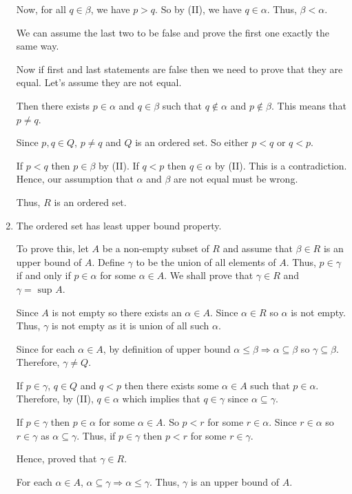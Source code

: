 \begin{enumerate}[{\bf Step 1.}]
Now, for all $q \in \beta$, we have $p > q$.
So by (II), we have $q \in \alpha$. Thus, $\beta < \alpha$.

We can assume the last two to be false and prove the first one exactly the same way.

Now if first and last statements are false then we need to prove that they are equal.
Let's assume they are not equal.

Then there exists $p \in \alpha$ and $q \in \beta$ such that $q \notin \alpha$ and $p \notin \beta$.
This means that $p \neq q$.

Since $p, q \in Q$, $p \neq q$ and $Q$ is an ordered set.
So either $p < q$ or $q < p$.

If $p < q$ then $p \in \beta$ by (II). If $q < p$ then $q \in \alpha$ by (II).
This is a contradiction. Hence, our assumption that $\alpha$ and $\beta$ are not equal must be wrong.

Thus, $R$ is an ordered set.

\item The ordered set has least upper bound property.

To prove this, let $A$ be a non-empty subset of $R$ and assume that $\beta \in R$ is an upper bound of $A$.
Define $\gamma$ to be the union of all elements of $A$.
Thus, $p \in \gamma$ if and only if $p \in \alpha$ for some $\alpha \in A$.
We shall prove that $\gamma \in R$ and $\gamma = \text{ sup } A$.

Since $A$ is not empty so there exists an $\alpha \in A$.
Since $\alpha \in R$ so $\alpha$ is not empty.
Thus, $\gamma$ is not empty as it is union of all such $\alpha$.

Since for each $\alpha \in A$, by definition of upper bound $\alpha \leq \beta \Rightarrow \alpha \subseteq \beta$ so $\gamma \subseteq \beta$.
Therefore, $\gamma \neq Q$.

If $p \in \gamma$, $q \in Q$ and $q < p$ then there exists some $\alpha \in A$ such that $p \in \alpha$.
Therefore, by (II), $q \in \alpha$ which implies that $q \in \gamma$ since $\alpha \subseteq \gamma$.

If $p \in \gamma$ then $p \in \alpha$ for some $\alpha \in A$. So $p < r$ for some $r \in \alpha$.
Since $r \in \alpha$ so $r \in \gamma$ as $\alpha \subseteq \gamma$.
Thus, if $p \in \gamma$ then $p < r$ for some $r \in \gamma$.

Hence, proved that $\gamma \in R$.

For each $\alpha \in A$, $\alpha \subseteq \gamma \Rightarrow \alpha \leq \gamma$. Thus, $\gamma$ is an upper bound of $A$.


\end{enumerate}
